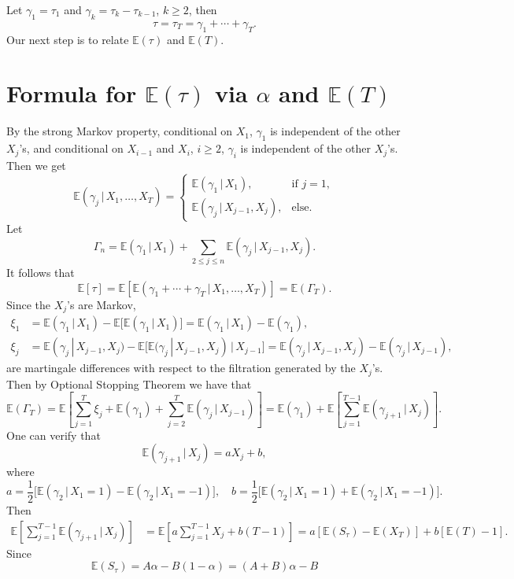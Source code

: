 \documentclass{amsart}
\newcommand{\EE}{{\mathbb{E}}}
\newcommand{\1}{{\mathbf{1}}}
\newcommand{\gv}{\,|\,}
\begin{document}
Let $\gamma_1=\tau_1$ and $\gamma_k=\tau_k-\tau_{k-1}$, $k\geq 2$, then
$$\tau=\tau_T=\gamma_1+\cdots+\gamma_T.$$
Our next step is to relate $\EE(\tau)$ and $\EE(T)$.

\section{Formula for $\EE(\tau)$ via $\alpha$ and $\EE(T)$}

By the strong Markov property, conditional on $X_1$, $\gamma_1$ is
independent of the other $X_j$'s, and conditional on $X_{i-1}$ and
$X_i$, $i\ge2$, $\gamma_i$ is independent of the other $X_j$'s.  Then we get
\[
  \EE(\gamma_j\gv X_1,\dots, X_{T})
  =
  \begin{cases}
    \EE(\gamma_1\gv X_1), & \text{if~} j=1,\\
    \EE(\gamma_j\gv X_{j-1}, X_j), &
    \text{else}.
  \end{cases}
\]
Let
\[
  \Gamma_n = \EE(\gamma_1\gv X_1) + \sum_{2\le j\le n} \EE(\gamma_j \gv
  X_{j-1}, X_j).
\]
It follows that
\[
  \EE[\tau]
  =
  \EE[\EE(\gamma_1+\cdots+ \gamma_{T}\gv X_1,\dots, X_{T})]
  = \EE(\Gamma_{T}).
\]
Since the $X_j$'s are Markov,
\begin{align*}
  \xi_1& = \EE(\gamma_1\gv X_1) - \EE\big[\EE(\gamma_1\gv X_1)\big]
  = \EE(\gamma_1\gv X_1) - \EE(\gamma_1),
  \\
  \xi_j
  &= \EE(\gamma_j\gv X_{j-1}, X_j)
  - \EE\big[\EE(\gamma_j\gv X_{j-1}, X_j)\gv X_{j-1}\big]
  = \EE(\gamma_j\gv X_{j-1}, X_j)
  - \EE(\gamma_j\gv X_{j-1}),
\end{align*}
are martingale differences with respect to the filtration generated by
the $X_j$'s.  Then by Optional Stopping Theorem we have that
\[
  \EE(\Gamma_{T})
  =
  \EE\left[\sum^{T}_{j=1} \xi_j
    +
    \EE(\gamma_1) + \sum^{T}_{j=2}
    \EE(\gamma_j\gv X_{j-1})\right]
  =
  \EE(\gamma_1) + \EE\left[\sum^{T-1}_{j=1}
    \EE(\gamma_{j+1}\gv X_j)\right].
\]
One can verify that
\[
  \EE(\gamma_{j+1}\gv X_j)
  = a X_j + b,
\]
where
\[
  a=\frac{1}{2}\big[\EE(\gamma_2\gv X_1=1) - \EE(\gamma_2\gv X_1=-1)\big],
  \quad
  b=\frac{1}{2}\big[\EE(\gamma_2\gv X_1=1) + \EE(\gamma_2\gv X_1=-1)\big].
\]
Then
\begin{align*}
  \EE\left[\sum^{T-1}_{j=1}
    \EE(\gamma_{j+1}\gv X_j)\right]
  &=
  \EE\left[a \sum^{T-1}_{j=1} X_j+ b(T-1)\right]
  =
  a [\EE(S_{\tau}) - \EE(X_{T})]
  + b[\EE(T) - 1].
\end{align*}
Since $$\EE(S_{\tau}) = A \alpha - B(1-\alpha)=(A+B)\alpha-B$$
\end{document}
